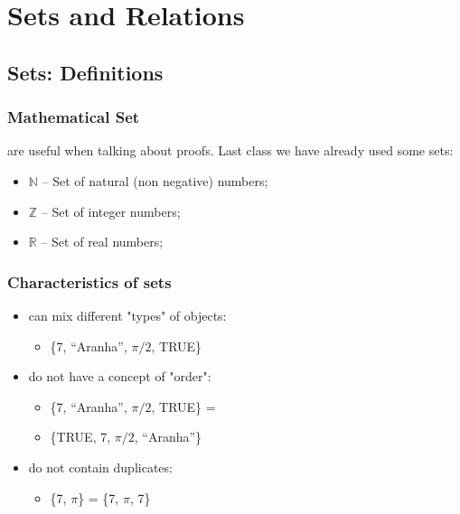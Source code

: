 \section{Sets and Relations}


\subsection{Sets: Definitions}
\begin{frame}
  \frametitle{Mathematical Set}

   are useful when talking about proofs. Last class we have already used some sets: \bigskip

  \begin{itemize}
    \item $\mathbb{N}$ -- Set of natural (non negative) numbers;
    \item $\mathbb{Z}$ -- Set of integer numbers;
    \item $\mathbb{R}$ -- Set of real numbers;
  \end{itemize}
\end{frame}

\begin{frame}
  \frametitle{Characteristics of sets}

  \begin{itemize}
    \item  {} can mix different "types" of objects:
    \begin{itemize}
    \item \{7, ``Aranha'', $\pi/2$, TRUE\}
    \end{itemize}\bigskip

    \item {} do not have a concept of "order":
    \begin{itemize}
      \item \{7, ``Aranha'', $\pi/2$, TRUE\} =   \item \{TRUE, 7, $\pi/2$, ``Aranha''\}
    \end{itemize}\bigskip

    \item {} do not contain duplicates:
    \begin{itemize}
    \item \{7, $\pi$\} = \{7, $\pi$, 7\}
    \end{itemize}
  \end{itemize}
\end{frame}

